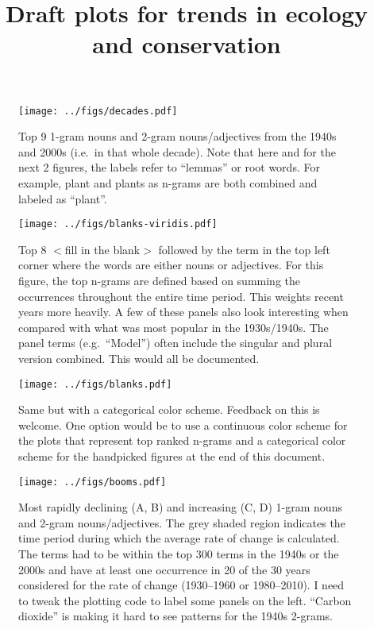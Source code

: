 \documentclass[12pt]{article}
\title{Draft plots for trends in ecology and conservation}
\author{}
\begin{document}
\maketitle


\begin{figure}[htbp]
\centering
\texttt{[image: ../figs/decades.pdf]}
\caption{Top 9 1-gram nouns and 2-gram nouns/adjectives from the 1940s and 2000s (i.e.\ in that whole decade). Note that here and
  for the next 2 figures, the labels refer to ``lemmas'' or root words. For example, plant
  and plants as n-grams are both combined and labeled as ``plant''.}
\end{figure}

\begin{figure}[htbp]
\centering
\texttt{[image: ../figs/blanks-viridis.pdf]}
\caption{Top 8 $<$fill in the blank$>$ followed by the term in the top left
  corner where the words are either nouns or adjectives. For this figure, the top n-grams are defined based on summing the occurrences throughout the entire time period. This weights recent years more heavily. A few of these panels also look interesting when compared with what was most popular in the 1930s/1940s. The panel terms (e.g.\ ``Model'') often include the singular and plural version combined. This would all be documented.}
\end{figure}

\clearpage

\begin{figure}[htbp]
\centering
\texttt{[image: ../figs/blanks.pdf]}
\caption{
Same but with a categorical color scheme. Feedback on this is welcome. One option would be to use a continuous color scheme for the plots that represent top ranked n-grams and a categorical color scheme for the handpicked figures at the end of this document.
 }
\end{figure}

\clearpage





\begin{figure}[htbp]
\centering
\texttt{[image: ../figs/booms.pdf]}
\caption{Most rapidly declining (A, B) and increasing (C, D) 1-gram nouns and
  2-gram nouns/adjectives. The grey shaded region indicates the time period
  during which the average rate of change is calculated. The terms had to be
  within the top 300 terms in the 1940s or the 2000s and have at least one
  occurrence in 20 of the 30 years considered for the rate of change (1930--1960 or 1980--2010). I need
  to tweak the plotting code to label some panels on the left. ``Carbon
  dioxide'' is making it hard to see patterns for the 1940s 2-grams.}
\end{figure}
\end{document}
